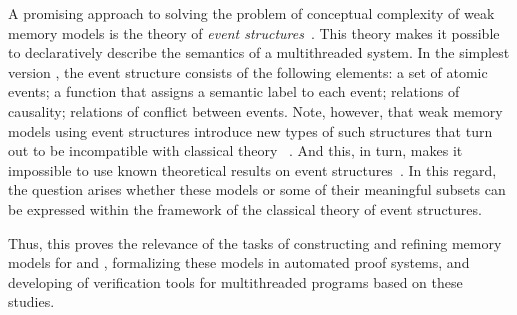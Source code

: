A promising approach to solving the problem of conceptual complexity of weak memory models is the theory of \emph{event structures}~\autocite{Winskel:86}.
This theory makes it possible to declaratively describe the semantics of a multithreaded system.
In the simplest version , the event structure consists of the following elements:
a set of atomic events;
a function that assigns a semantic label to each event;
relations of causality; relations of conflict between events.
Note, however, that weak memory models using event structures introduce new types of such structures that turn out to be incompatible with classical theory%
~\cite{Winskel:86,Nielsen-al:1981,Boudol-Castellani:1991,Langerak:91,Baldan-al:IC01}.
And this, in turn, makes it impossible to use known theoretical results
on event structures~\autocite{Vaandrager:TCS1991,Sassone:MFCS1993,Nielsen:REX93,Winskel-TCS:09}.
In this regard, the question arises whether these models or some of their meaningful subsets can be expressed within the framework of the classical theory of event structures.

Thus, this proves the relevance of the tasks of constructing and refining memory models for \CPP and \Java, formalizing these models in automated proof systems, 
and developing of verification tools for multithreaded programs based on these studies.

